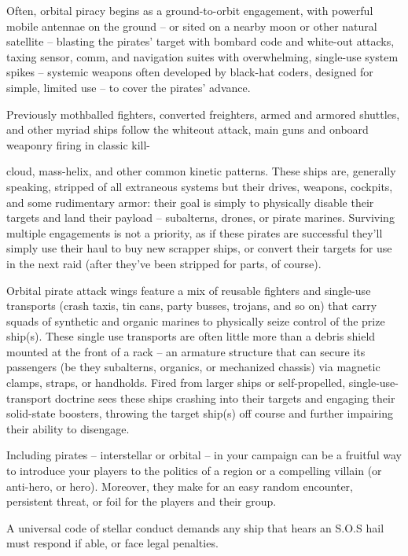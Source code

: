 Often, orbital piracy begins as a ground-to-orbit engagement, with powerful mobile antennae on
the ground -- or sited on a nearby moon or other natural satellite -- blasting the pirates’ target with
bombard code and white-out attacks, taxing sensor, comm, and navigation suites with
overwhelming, single-use system spikes -- systemic weapons often developed by black-hat
coders, designed for simple, limited use -- to cover the pirates’ advance.

Previously mothballed fighters, converted freighters, armed and armored shuttles, and other
myriad ships follow the whiteout attack, main guns and onboard weaponry firing in classic kill-




cloud, mass-helix, and other common kinetic patterns. These ships are, generally speaking,
stripped of all extraneous systems but their drives, weapons, cockpits, and some rudimentary
armor: their goal is simply to physically disable their targets and land their payload -- subalterns,
drones, or pirate marines. Surviving multiple engagements is not a priority, as if these pirates are
successful they’ll simply use their haul to buy new scrapper ships, or convert their targets for use
in the next raid (after they’ve been stripped for parts, of course).

Orbital pirate attack wings feature a mix of reusable fighters and single-use transports (crash
taxis, tin cans, party busses, trojans, and so on) that carry squads of synthetic and organic
marines to physically seize control of the prize ship(s). These single use transports are often little
more than a debris shield mounted at the front of a rack -- an armature structure that can secure
its passengers (be they subalterns, organics, or mechanized chassis) via magnetic clamps,
straps, or handholds. Fired from larger ships or self-propelled, single-use-transport doctrine sees
these ships crashing into their targets and engaging their solid-state boosters, throwing the target
ship(s) off course and further impairing their ability to disengage.

Including pirates -- interstellar or orbital -- in your campaign can be a fruitful way to introduce your
players to the politics of a region or a compelling villain (or anti-hero, or hero). Moreover, they
make for an easy random encounter, persistent threat, or foil for the players and their group.

A universal code of stellar conduct demands any ship that hears an S.O.S hail must respond if
able, or face legal penalties.

